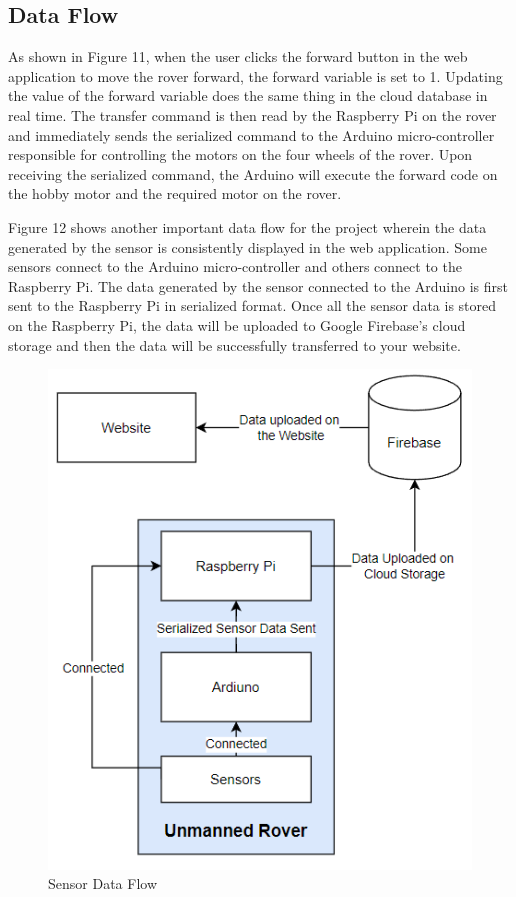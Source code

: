 \documentclass[conference,a4paper]{IEEEtran}
\begin{document}
\subsection{Data Flow}
As shown in Figure 11, when the user clicks the forward button in the web application to move the rover forward, the forward variable is set to 1. Updating the value of the forward variable does the same thing in the cloud database in real time. The transfer command is then read by the Raspberry Pi on the rover and immediately sends the serialized command  to the Arduino micro-controller  responsible for controlling the motors on the four wheels of the rover. Upon receiving the serialized command, the Arduino will execute the forward code on the hobby motor and the required motor on the rover.

Figure 12 shows another important data flow for the project wherein the data generated by the sensor is consistently displayed in the web application. Some sensors connect to the Arduino micro-controller and others connect to the Raspberry Pi. The data  generated by the sensor connected to the Arduino is first sent  to the Raspberry Pi in serialized format. Once all the sensor data is stored on the Raspberry Pi, the data will be uploaded to Google Firebase's cloud storage and then the data will be successfully transferred to your website.
\begin{figure}[ht]
\centering
\includegraphics[width=1\linewidth]{sensor.png}
\caption{Sensor Data Flow}
\label{Fig: Data Flow}
\end{figure}
\end{document}
